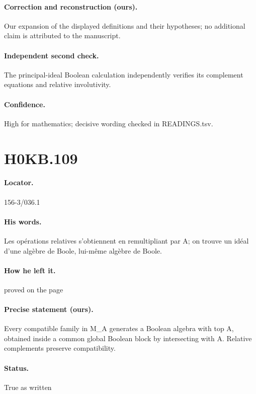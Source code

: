 \paragraph{Correction and reconstruction (ours).} Our expansion of the displayed definitions and their hypotheses; no additional claim is attributed to the manuscript.

\paragraph{Independent second check.} The principal-ideal Boolean calculation independently verifies its complement equations and relative involutivity.

\paragraph{Confidence.} High for mathematics; decisive wording checked in READINGS.tsv.

\section*{H0KB.109}\label{statement:H0KB.109}
\paragraph{Locator.} 156-3/036.1

\paragraph{His words.} Les opérations relatives s’obtiennent en remultipliant par A; on trouve un idéal d’une algèbre de Boole, lui-même algèbre de Boole.

\paragraph{How he left it.} proved on the page

\paragraph{Precise statement (ours).} Every compatible family in M\_A generates a Boolean algebra with top A, obtained inside a common global Boolean block by intersecting with A. Relative complements preserve compatibility.

\paragraph{Status.} True as written

